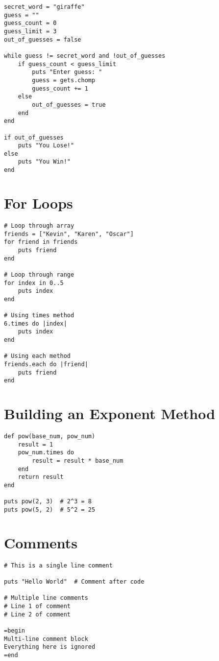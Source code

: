 \documentclass[12pt,a4paper]{article}
\begin{document}
\begin{lstlisting}
secret_word = "giraffe"
guess = ""
guess_count = 0
guess_limit = 3
out_of_guesses = false

while guess != secret_word and !out_of_guesses
    if guess_count < guess_limit
        puts "Enter guess: "
        guess = gets.chomp
        guess_count += 1
    else
        out_of_guesses = true
    end
end

if out_of_guesses
    puts "You Lose!"
else
    puts "You Win!"
end
\end{lstlisting}

\section{For Loops}

\begin{lstlisting}
# Loop through array
friends = ["Kevin", "Karen", "Oscar"]
for friend in friends
    puts friend
end

# Loop through range
for index in 0..5
    puts index
end

# Using times method
6.times do |index|
    puts index
end

# Using each method
friends.each do |friend|
    puts friend
end
\end{lstlisting}

\section{Building an Exponent Method}

\begin{lstlisting}
def pow(base_num, pow_num)
    result = 1
    pow_num.times do
        result = result * base_num
    end
    return result
end

puts pow(2, 3)  # 2^3 = 8
puts pow(5, 2)  # 5^2 = 25
\end{lstlisting}

\section{Comments}

\begin{lstlisting}
# This is a single line comment

puts "Hello World"  # Comment after code

# Multiple line comments
# Line 1 of comment
# Line 2 of comment

=begin
Multi-line comment block
Everything here is ignored
=end
\end{lstlisting}
\end{document}

